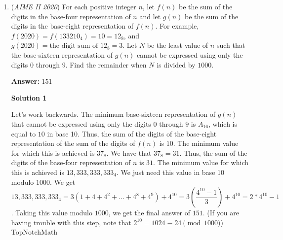 \begin{enumerate}
 We can obtain the follow equations:$\begin{cases} -x\cos(m^{\circ})-y\sin(m^{\circ})=24-x \\ -x\cos(m^{\circ})-y\sin(m^{\circ})+12\sin(m^{\circ})=36-x \\ x\sin(m^{\circ})-y\cos(m^{\circ})=24-x \end{cases}$

 From the first 2 equations, we get $m=90$, substituting into the 3rd equation, we get $x+y=18$.

 Therefore, $m+x+y=90+18=\boxed{108}$




\textbf{Solution 8}

It is clear that $\bigtriangleup CPC'$ is a $45-45-90$ right triangle so $m=90$. We use the $\tan$ angle formula, $\tan{(a-b)}=\frac{\tan(a)-\tan(b)}{1+\tan(a)\tan(b)}$ to find the slope of line $CP$. We know that line $CC'$ has slope $\frac{1}{4}$ and let $b=-45^{\circ}$, then plugging both values into the formula, we find that the slope of $CP$ is $\frac{-3}{5}$. Also, $CC'$ has length $\sqrt{34}$. Create a right triangle $KCP$ where $KP$ is parallel to the $x$ axis and $CP$ is the hypotenuse. Then $CK=3x$ and $KP=5x$ and doing Pythagorean on $\bigtriangleup KCP$ gives $x=1$. Therefore, we know that $P$ is a translation 3 units down and 5 units right from $C(16,0)$, from which we obtain $P(21,-3)$. Adding the three variables, we obtain $90+21-3=\boxed{108}$



	\item (\textit{AIME II 2020}) For each positive integer $n$, let $f(n)$ be the sum of the digits in the base-four representation of $n$ and let $g(n)$ be the sum of the digits in the base-eight representation of $f(n)$. For example, $f(2020) = f(133210_{\text{4}}) = 10 = 12_{\text{8}}$, and $g(2020) = \text{the digit sum of }12_{\text{8}} = 3$. Let $N$ be the least value of $n$ such that the base-sixteen representation of $g(n)$ cannot be expressed using only the digits $0$ through $9$. Find the remainder when $N$ is divided by $1000$.


 
 \textbf{Answer: }151



\textbf{Solution 1}

Let's work backwards. The minimum base-sixteen representation of $g(n)$ that cannot be expressed using only the digits $0$ through $9$ is $A_{16}$, which is equal to $10$ in base 10.  Thus, the sum of the digits of the base-eight representation of the sum of the digits of $f(n)$ is $10$.  The minimum value for which this is achieved is $37_8$.  We have that $37_8 = 31$.  Thus, the sum of the digits of the base-four representation of $n$ is $31$.  The minimum value for which this is achieved is $13,333,333,333_4$.  We just need this value in base 10 modulo 1000.  We get $13,333,333,333_4 = 3(1 + 4 + 4^2 + \dots + 4^8 + 4^9) + 4^{10} = 3\left(\dfrac{4^{10} - 1}{3}\right) + 4^{10} = 2*4^{10} - 1$.  Taking this value modulo $1000$, we get the final answer of $\boxed{151}$.  (If you are having trouble with this step, note that $2^{10} = 1024 \equiv 24 \pmod{1000}$) ~ TopNotchMath


\end{enumerate}
